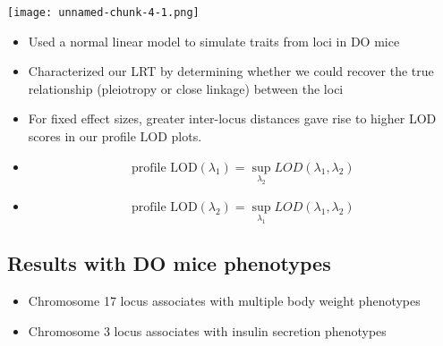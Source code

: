 \documentclass[a0,landscape]{a0poster}
\begin{document}
\begin{multicols}{4}
\begin{center}\vspace{1cm}
\texttt{[image: unnamed-chunk-4-1.png]}
\end{center}\vspace{1cm}



\begin{itemize}
\item Used a normal linear model to simulate traits from loci in DO mice
\item Characterized our LRT by determining whether we could recover the true relationship (pleiotropy or close linkage) between the loci
\item For fixed effect sizes, greater inter-locus distances gave rise to higher LOD scores in our profile LOD plots.
\item \begin{equation}
\text{profile LOD}(\lambda_1) = \sup_{\lambda_2}LOD(\lambda_1, \lambda_2)
\end{equation}
\item \begin{equation}
\text{profile LOD}(\lambda_2) = \sup_{\lambda_1}LOD(\lambda_1, \lambda_2)
\end{equation}


\end{itemize}


\subsection*{Results with DO mice phenotypes}

\begin{itemize}
\item Chromosome 17 locus associates with multiple body weight phenotypes
\item Chromosome 3 locus associates with insulin secretion phenotypes
\end{itemize}



\end{multicols}
\end{document}
